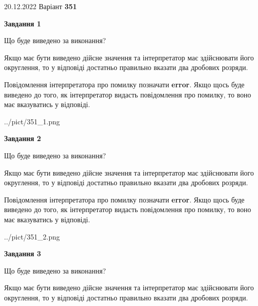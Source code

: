 \documentclass[12pt, ukrainian]{article}
\begin{document}
{20.12.2022 Варіант \No \textbf { 351 }\par}
{
\begin {Large}

{\begin {center}\textbf{Завдання 1}\end {center}}\par
Що буде виведено за виконання? \par

Якщо має бути виведено дійсне значення та інтерпретатор має здійснювати його округлення, 
то у відповіді достатньо правильно вказати два дробових розряди.

Повідомлення інтерпретатора про помилку позначати \textbf{error}.
Якщо щось буде виведено до того, як інтерпретатор видасть повідомлення про помилку, 
то воно має вказуватись у відповіді. \par

\begin{center}
	{../pict/351_1.png}
\end{center}
\newpage

{\begin {center}\textbf{Завдання 2}\end {center}}\par
Що буде виведено за виконання? \par

Якщо має бути виведено дійсне значення та інтерпретатор має здійснювати його округлення, 
то у відповіді достатньо правильно вказати два дробових розряди.

Повідомлення інтерпретатора про помилку позначати \textbf{error}.
Якщо щось буде виведено до того, як інтерпретатор видасть повідомлення про помилку, 
то воно має вказуватись у відповіді. \par

\begin{center}
	{../pict/351_2.png}
\end{center}
\newpage

{\begin {center}\textbf{Завдання 3}\end {center}}\par
Що буде виведено за виконання? \par

Якщо має бути виведено дійсне значення та інтерпретатор має здійснювати його округлення, 
то у відповіді достатньо правильно вказати два дробових розряди.


\end{Large}}
\end{document}
